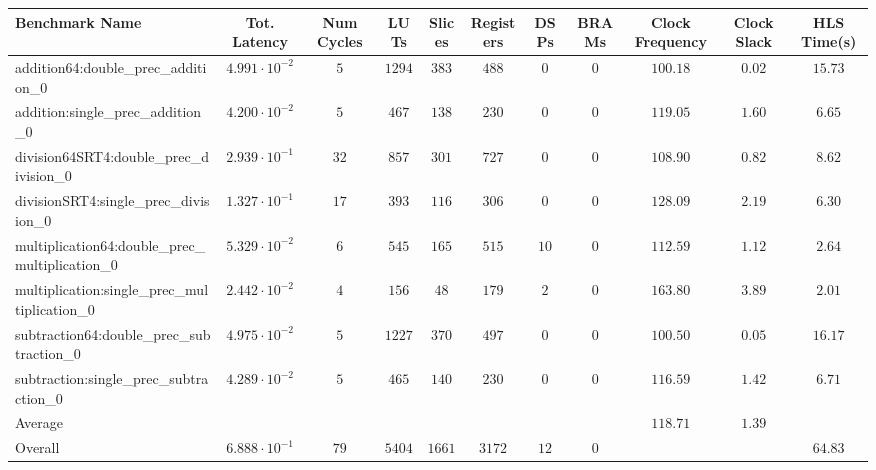 \begin{tabular}{|l|c|c|c|c|c|c|c|c|c|c|}
\hline
Benchmark Name                                   & Tot. Latency            & Num Cycles & LUTs     & Slices   & Registers & DSPs   & BRAMs & Clock Frequency & Clock Slack & HLS Time(s) \\
\hline
addition64:double\_prec\_addition\_0             & $ 4.991 \cdot 10^{-2} $ & $ 5      $ & $ 1294 $ & $ 383  $ & $ 488   $ & $ 0  $ & $ 0 $ & $ 100.18      $ & $ 0.02    $ & $ 15.73   $ \\
addition:single\_prec\_addition\_0               & $ 4.200 \cdot 10^{-2} $ & $ 5      $ & $ 467  $ & $ 138  $ & $ 230   $ & $ 0  $ & $ 0 $ & $ 119.05      $ & $ 1.60    $ & $ 6.65    $ \\
division64SRT4:double\_prec\_division\_0         & $ 2.939 \cdot 10^{-1} $ & $ 32     $ & $ 857  $ & $ 301  $ & $ 727   $ & $ 0  $ & $ 0 $ & $ 108.90      $ & $ 0.82    $ & $ 8.62    $ \\
divisionSRT4:single\_prec\_division\_0           & $ 1.327 \cdot 10^{-1} $ & $ 17     $ & $ 393  $ & $ 116  $ & $ 306   $ & $ 0  $ & $ 0 $ & $ 128.09      $ & $ 2.19    $ & $ 6.30    $ \\
multiplication64:double\_prec\_multiplication\_0 & $ 5.329 \cdot 10^{-2} $ & $ 6      $ & $ 545  $ & $ 165  $ & $ 515   $ & $ 10 $ & $ 0 $ & $ 112.59      $ & $ 1.12    $ & $ 2.64    $ \\
multiplication:single\_prec\_multiplication\_0   & $ 2.442 \cdot 10^{-2} $ & $ 4      $ & $ 156  $ & $ 48   $ & $ 179   $ & $ 2  $ & $ 0 $ & $ 163.80      $ & $ 3.89    $ & $ 2.01    $ \\
subtraction64:double\_prec\_subtraction\_0       & $ 4.975 \cdot 10^{-2} $ & $ 5      $ & $ 1227 $ & $ 370  $ & $ 497   $ & $ 0  $ & $ 0 $ & $ 100.50      $ & $ 0.05    $ & $ 16.17   $ \\
subtraction:single\_prec\_subtraction\_0         & $ 4.289 \cdot 10^{-2} $ & $ 5      $ & $ 465  $ & $ 140  $ & $ 230   $ & $ 0  $ & $ 0 $ & $ 116.59      $ & $ 1.42    $ & $ 6.71    $ \\
\hline
Average                                          & $                     $ & $        $ & $      $ & $      $ & $       $ & $    $ & $   $ & $ 118.71      $ & $ 1.39    $ & $         $ \\
\hline
Overall                                          & $ 6.888 \cdot 10^{-1} $ & $ 79     $ & $ 5404 $ & $ 1661 $ & $ 3172  $ & $ 12 $ & $ 0 $ & $             $ & $         $ & $ 64.83   $ \\
\hline
\end{tabular}
